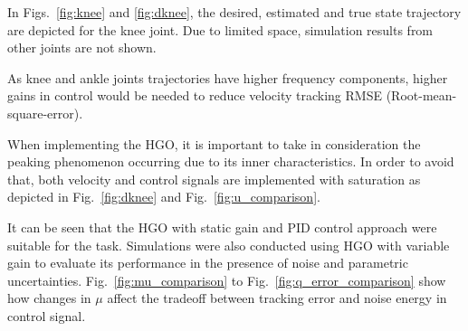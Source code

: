 \documentclass[letterpaper, 10 pt, conference]{ieeeconf}  %
\theoremstyle{plain}
\theoremstyle{definition}
\theoremstyle{remark}
\begin{document}
In Figs.~\ref{fig:knee} and \ref{fig:dknee}, the desired, estimated and true state trajectory are depicted for the knee joint. Due to limited space, simulation results from other joints are not shown.%

As knee and ankle joints trajectories have higher frequency components, higher gains in control would be needed to reduce velocity tracking RMSE (Root-mean-square-error).

When implementing the HGO, it is important to take in consideration the peaking phenomenon occurring due to its inner characteristics. In order to avoid that, both velocity and control signals are implemented with saturation as depicted in Fig.~\ref{fig:dknee} and Fig.~\ref{fig:u_comparison}.

It can be seen that the HGO with static gain and PID control approach were suitable for the task.
%
Simulations were also conducted using HGO with variable gain to evaluate its performance in the presence of noise and parametric uncertainties. Fig.~\ref{fig:mu_comparison} to Fig.~\ref{fig:q_error_comparison} show how changes in $\mu$ affect the tradeoff between tracking error and noise energy in control signal.

%
%
%
%

\end{document}
